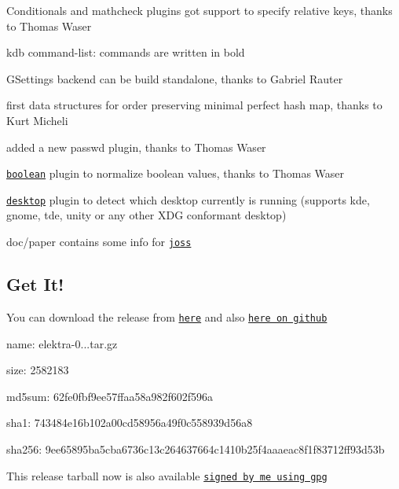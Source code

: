 \begin{DoxyItemize}
\item Conditionals and mathcheck plugins got support to specify relative keys, thanks to Thomas Waser
\item {\ttfamily kdb} command-\/list\+: commands are written in bold
\item G\+Settings backend can be build standalone, thanks to Gabriel Rauter
\item first data structures for order preserving minimal perfect hash map, thanks to Kurt Micheli
\item added a new passwd plugin, thanks to Thomas Waser
\item \href{https://git.libelektra.org/tree/master/src/plugins/boolean}{\tt boolean} plugin to normalize boolean values, thanks to Thomas Waser
\item \href{https://git.libelektra.org/tree/master/src/plugins/desktop}{\tt desktop} plugin to detect which desktop currently is running (supports kde, gnome, tde, unity or any other X\+DG conformant desktop)
\item {\ttfamily doc/paper} contains some info for \href{https://github.com/openjournals/joss}{\tt joss}
\end{DoxyItemize}

\subsection*{Get It!}

You can download the release from \href{https://www.libelektra.org/ftp/elektra/releases/elektra-0.8.18.tar.gz}{\tt here} and also \href{https://github.com/ElektraInitiative/ftp/tree/master/releases/elektra-0.8.18.tar.gz}{\tt here on github}


\begin{DoxyItemize}
\item name\+: elektra-\/0...\+tar.\+gz
\item size\+: 2582183
\item md5sum\+: 62fe0fbf9ee57ffaa58a982f602f596a
\item sha1\+: 743484e16b102a00cd58956a49f0c558939d56a8
\item sha256\+: 9ee65895ba5cba6736c13c264637664c1410b25f4aaaeac8f1f83712ff93d53b
\end{DoxyItemize}

This release tarball now is also available \href{https://www.libelektra.org/ftp/elektra/releases/elektra-0.8.18.tar.gz.gpg}{\tt signed by me using gpg}

